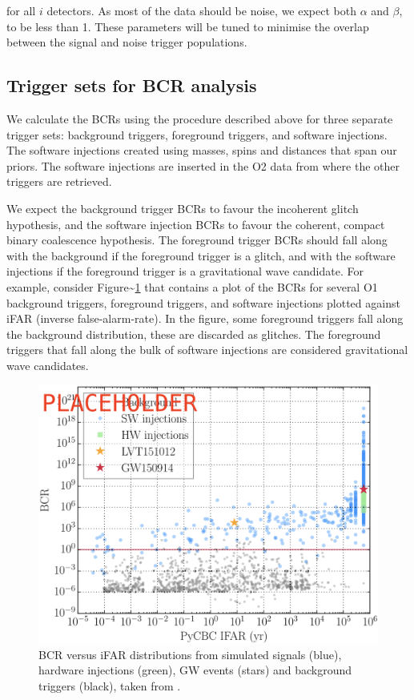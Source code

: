 \documentclass[%
 reprint,
 amsmath,amssymb,
 aps,
]{revtex4}
\begin{document}
for all \(i\) detectors. As most of the data should be noise, we expect both \(\alpha\) and \(\beta\), to be less than 1.
These parameters will be tuned to minimise the overlap between the signal and noise trigger populations.

\hypertarget{trigger-sets-for-bcr-analysis}{%
\subsection{Trigger sets for BCR analysis}\label{trigger-sets-for-bcr-analysis}}

We calculate the BCRs using the procedure described above for three separate trigger sets: background triggers,
foreground triggers, and software injections. The software injections created using masses, spins and distances that
span our priors. The software injections are inserted in the O2 data from where the other triggers are retrieved.

We expect the background trigger BCRs to favour the incoherent glitch hypothesis, and the software injection BCRs to
favour the coherent, compact binary coalescence hypothesis. The foreground trigger BCRs should fall along with the
background if the foreground trigger is a glitch, and with the software injections if the foreground trigger is a
gravitational wave candidate. For example, consider Figure\textasciitilde\ref{fig:bcrIfar} that contains a plot of the BCRs for
several O1 background triggers, foreground triggers, and software injections plotted against iFAR (inverse
false-alarm-rate). In the figure, some foreground triggers fall along the background distribution, these are discarded
as glitches. The foreground triggers that fall along the bulk of software injections are considered gravitational wave
candidates.



\begin{figure}[!h]

{\centering \includegraphics[width=0.75\linewidth]{images/bcr_ifar} 

}

\caption[BCR vs iFAR for O1]{BCR versus iFAR distributions from simulated signals (blue), hardware injections (green), GW events (stars) and background triggers (black), taken from \citet{bcr_paper}.}\label{fig:bcrIfar}
\end{figure}
\end{document}
